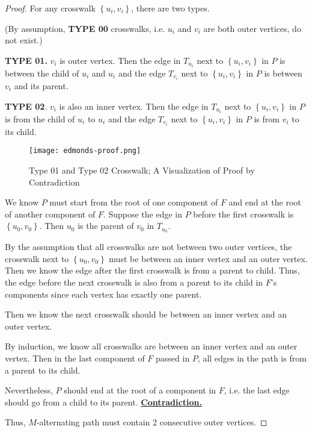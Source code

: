 \documentclass{article}
\newcommand{\set}[1]{\left\{#1\right\}}
\begin{document}
\begin{proof}
    \hspace{1.3em}
    For any crosswalk $\set{u_i,v_i}$, there are two types. 
    
    \hspace{1.3em}
    (By assumption, \textbf{TYPE 00} crosswalks, i.e. $u_i$ and $v_i$ are both outer vertices, do not exist.)
    
    \hspace{1.3em}
    \textbf{TYPE 01.} $v_i$ is outer vertex. 
    Then the edge in $T_{u_i}$ next to $\set{u_i,v_i}$ in $P$ is between the child of $u_i$ and $u_i$ and the edge $T_{v_i}$ next to $\set{u_i,v_i}$ in $P$ is between $v_i$ and its parent.
    
    \hspace{1.3em}
    \textbf{TYPE 02}. $v_i$ is also an inner vertex. 
    Then the edge in $T_{u_i}$ next to $\set{u_i,v_i}$ in $P$ is from the child of $u_i$ to $u_i$ and the edge $T_{v_i}$ next to $\set{u_i,v_i}$ in $P$ is from $v_i$ to its child.
    
    \begin{figure}[tbh]
        \centering
        \texttt{[image: edmonds-proof.png]}
        \caption{Type 01 and Type 02 Crosswalk; A Visualization of Proof by Contradiction}
        \label{fig:my_label}
    \end{figure}
    
    \vspace{1em} \hspace{1.3em}
    We know $P$ must start from the root of one component of $F$ and end at the root of another component of $F$. Suppose the edge in $P$ before the first crosswalk is $\set{u_0,v_0}$. Then $u_0$ is the parent of $v_0$ in $T_{u_0}$.
    
    \hspace{1.3em}
    By the assumption that all crosswalks are not between two outer vertices, the crosswalk next to $\set{u_0,v_0}$ must be between an inner vertex and an outer vertex. Then we know the edge after the first crosswalk is from a parent to child. Thus, the edge before the next crosswalk is also from a parent to its child in $F$'s components since each vertex has exactly one parent. 
    
    \hspace{1.3em}
    Then we know the next crosswalk should be between an inner vertex and an outer vertex.
    
    \hspace{1.3em}
    By induction, we know all crosswalks are between an inner vertex and an outer vertex. Then in the last component of $F$ passed in $P$, all edges in the path is from a parent to its child.
    
    \hspace{1.3em}
    Nevertheless, $P$ should end at the root of a component in $F$, i.e. the last edge should go from a child to its parent. \underline{\textbf{Contradiction.}}
    
    \vspace{0.75em} \hspace{1.3em}
    Thus, $M$-alternating path must contain 2 consecutive outer vertices.
\end{proof}
\end{document}
